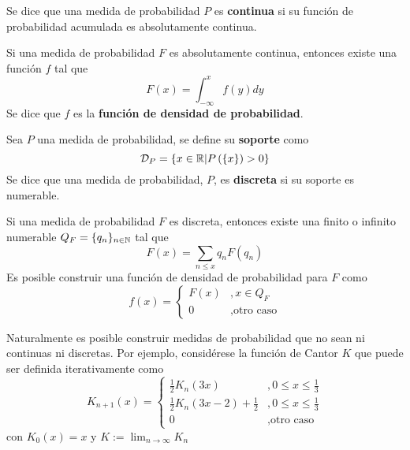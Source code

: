 Se dice que una medida de probabilidad $P$ es \textbf{continua} si su función de probabilidad acumulada es absolutamente continua.

\begin{proposicion}
Si una medida de probabilidad $F$ es absolutamente continua, entonces existe una función $f$ tal que 
\begin{equation}
F(x) = \int_{-\infty}^{x}f(y) dy
\end{equation}
Se dice que $f$ es la \textbf{función de densidad de probabilidad}.
\end{proposicion}

Sea $P$ una medida de probabilidad, se define su \textbf{soporte} como
\begin{equation}
\mathcal{D}_P = \left\{ x\in \mathbb{R} \lvert P\left( \left\{ x\right\} \right)>0 \right\}
\end{equation}
%
Se dice que una medida de probabilidad, $P$, es \textbf{discreta} si su soporte es numerable.

\begin{proposicion}
Si una medida de probabilidad $F$ es discreta, entonces existe una finito o infinito numerable $Q_F=\{q_n\}_{n\in \mathbb{N}}$ tal que 
\begin{equation}
F(x) = \sum_{n\leq x} q_n F({q_n})
\end{equation}
Es posible construir una función de densidad de probabilidad para $F$ como
\begin{equation}
f(x) = \begin{cases}
F({x}) &, x\in Q_F \\
0 &, \text{otro caso}
\end{cases}
\end{equation}
\end{proposicion}

Naturalmente es posible construir medidas de probabilidad que no sean ni continuas ni discretas. Por ejemplo, considérese la función de Cantor $K$ que puede ser definida iterativamente como
\begin{equation}
K_{n+1}(x) =
\begin{cases}
\frac{1}{2} K_n(3 x) &, 0\leq x \leq \frac{1}{3} \\
\frac{1}{2} K_n(3 x-2) + \frac{1}{2} &, 0\leq x \leq \frac{1}{3} \\
0 &, \text{otro caso}
\end{cases}
\end{equation}
con $K_0(x) = x$ y $K := \lim_{n\rightarrow \infty} K_n$

